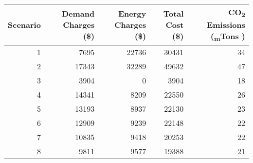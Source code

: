 \begin{tabular}{rrrrr}
\toprule
 Scenario &  Demand Charges (\$) &  Energy Charges (\$) &  Total Cost (\$) & CO\textsubscript{2} Emissions (\textsubscript{m}Tons )\\
\midrule
        1 &                7695 &               22736 &           30431 &         34 \\
        2 &               17343 &               32289 &           49632 &         47 \\
        3 &                3904 &                   0 &            3904 &         18 \\
        4 &               14341 &                8209 &           22550 &         26 \\
        5 &               13193 &                8937 &           22130 &         23 \\
        6 &               12909 &                9239 &           22148 &         22 \\
        7 &               10835 &                9418 &           20253 &         22 \\
        8 &                9811 &                9577 &           19388 &         21 \\
\bottomrule
\end{tabular}

